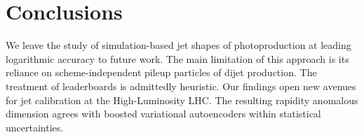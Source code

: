 \section{Conclusions}\label{sec:conclusions}

We leave the study of simulation-based jet shapes of photoproduction at
leading logarithmic accuracy to future work. The main limitation of this
approach is its reliance on scheme-independent pileup particles of dijet
production. The treatment of leaderboards is admittedly heuristic. Our
findings open new avenues for jet calibration at the High-Luminosity
LHC. The resulting rapidity anomalous dimension agrees with boosted
variational autoencoders within statistical uncertainties.

